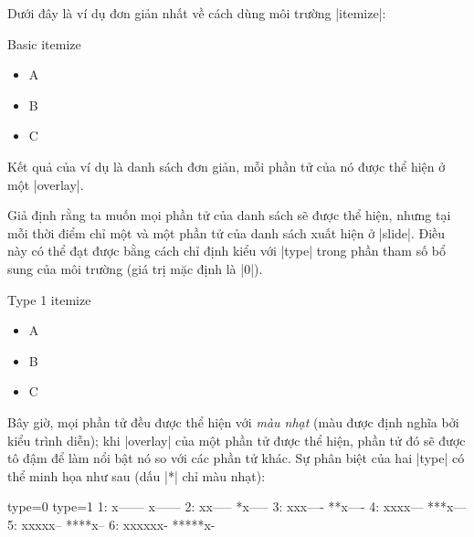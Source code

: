 Dưới đây là ví dụ đơn giản nhất về cách dùng môi trường |itemize|:
\begin{example}
 \begin{slide}{Basic itemize}
   \begin{itemize}
     \item A \pause
     \item B \pause
     \item C
   \end{itemize}
 \end{slide}
\end{example}
Kết quả của ví dụ là danh sách đơn giản, mỗi phần tử của nó
được thể hiện ở một |overlay|.

Giả định rằng ta muốn mọi phần tử của danh sách sẽ được thể hiện,
nhưng tại mỗi thời điểm chỉ một và một phần tử của danh sách xuất hiện
ở |slide|. Điều này có thể đạt được bằng cách chỉ định kiểu với |type|
trong phần tham số bổ sung của môi trường (giá trị mặc định là |0|).
\begin{example}
 \begin{slide}{Type 1 itemize}
   \begin{itemize}[type=1]
     \item A \pause
     \item B \pause
     \item C
   \end{itemize}
 \end{slide}
\end{example}
Bây giờ, mọi phần tử đều được thể hiện với \emph{màu nhạt}
(màu được định nghĩa bởi kiểu trình diễn); khi |overlay| của một phần
tử được thể hiện, phần tử đó sẽ được tô đậm để làm nổi bật nó so
với các phần tử khác. Sự phân biệt của hai |type| có thể minh họa như
sau (dấu |*| chỉ màu nhạt):
\begin{example}
     type=0        type=1
  1: x------       x------
  2: xx-----       *x----- 
  3: xxx----       **x---- 
  4: xxxx---       ***x--- 
  5: xxxxx--       ****x--
  6: xxxxxx-       *****x-
\end{example}


